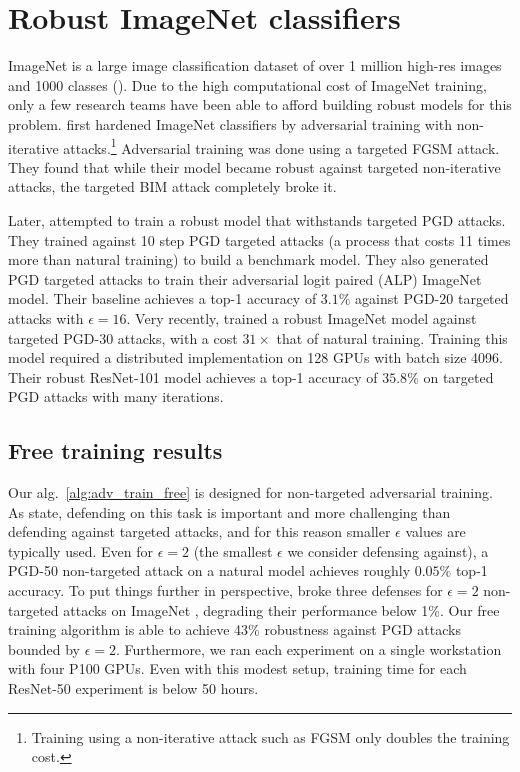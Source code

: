 \documentclass{article}
\begin{document}
\section{Robust ImageNet classifiers}
ImageNet is a large image classification dataset of over 1 million high-res images and 1000 classes (\cite{russakovsky2015imagenet}). Due to the high computational cost of ImageNet training, only a few research teams have been able to afford building robust models for this problem. \cite{kurakin2016adversarial} first hardened ImageNet classifiers by adversarial training with non-iterative attacks.\footnote{Training using a non-iterative attack such as FGSM only doubles the training cost. }
Adversarial training was done using a targeted FGSM attack. 
 They found that while their model became robust against targeted non-iterative attacks, the targeted BIM attack completely broke it. 

Later, \cite{kannan2018adversarial} attempted to train a robust model that withstands targeted PGD attacks. They trained against 10 step PGD targeted attacks (a process that costs 11 times more than natural training) to build a benchmark model. They also generated PGD targeted attacks to train their adversarial logit paired (ALP) ImageNet model. Their baseline achieves a top-1 accuracy of $3.1\%$ against PGD-20 targeted attacks with $\epsilon=16$. 
Very recently, \cite{xie2018feature} trained a robust ImageNet model against targeted PGD-30 attacks, with a cost $31\times$ that of natural training.  Training this model required a distributed implementation on 128 GPUs with batch size 4096.
Their robust ResNet-101 model achieves a top-1 accuracy of $35.8\%$ on targeted PGD attacks with many iterations.

\subsection*{Free training results}
Our alg.~\ref{alg:adv_train_free} is designed for non-targeted adversarial training. As \cite{athalye2018obfuscated} state, defending on this task is important and more challenging than defending against targeted attacks, and for this reason smaller $\epsilon$ values are typically used.
Even for $\epsilon=2$ (the smallest $\epsilon$ we consider defensing against), a PGD-50 non-targeted attack on a natural model achieves roughly $0.05\%$ top-1 accuracy. To put things further in perspective, \cite{uesato2018adversarial} broke three defenses for $\epsilon=2$ non-targeted attacks on ImageNet \citep{guo2017countering, liao2018defense, xie2017mitigating}, degrading their performance below 1\%. 
Our free training algorithm is able to achieve 43\% robustness against PGD attacks bounded by $\epsilon=2$. Furthermore, we ran each experiment on a single workstation with four P100 GPUs.  Even with this modest setup, training time for each ResNet-50 experiment is below 50 hours.  
\end{document}
